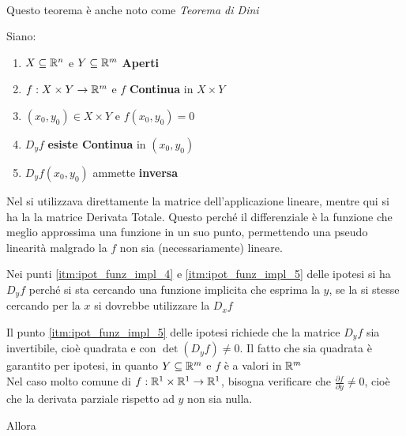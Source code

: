 \begin{theorem}~
	\label{teo:funz_impl}
	\vspace*{-\baselineskip}
	\begin{note}
		Questo teorema è anche noto come \textit{Teorema di Dini}
	\end{note}
	Siano:
	\begin{enumerate}[noitemsep]
		\item \label{itm:ipot_funz_impl_1} $X \subseteq \mathbb{R}^n$ e $Y \subseteq \mathbb{R}^m$ \textbf{Aperti}
		\item \label{itm:ipot_funz_impl_2} $f: X \times Y \to \mathbb{R}^m$ e $f$ \textbf{Continua} in $X \times Y$
		\item \label{itm:ipot_funz_impl_3} $(x_0, y_0) \in X \times Y$ e $f(x_0, y_0) = 0$
		\item \label{itm:ipot_funz_impl_4} $D_yf$ \textbf{esiste Continua} in $(x_0, y_0)$
		\item \label{itm:ipot_funz_impl_5} $D_yf(x_0, y_0)$ ammette \textbf{inversa}
	\end{enumerate}
	\begin{note}
		\hypertarget{note:teo_funz_impl_note_ipot1}{}
		Nel  si utilizzava direttamente la matrice dell'applicazione lineare, mentre qui si ha la la matrice Derivata Totale. Questo perché il differenziale è la funzione che meglio approssima una funzione in un suo punto, permettendo una pseudo linearità malgrado la $f$ non sia (necessariamente) lineare.
	\end{note}
	\begin{note}
		Nei punti \ref{itm:ipot_funz_impl_4} e \ref{itm:ipot_funz_impl_5} delle ipotesi si ha $D_yf$ perché si sta cercando una funzione implicita che esprima la $y$, se la si stesse cercando per la $x$ si dovrebbe utilizzare la $D_xf$
	\end{note}
	\begin{note}
		Il punto \ref{itm:ipot_funz_impl_5} delle ipotesi richiede che la matrice $D_yf$ sia invertibile, cioè quadrata e con $\det(D_yf) \neq 0$. Il fatto che sia quadrata è garantito per ipotesi, in quanto $Y \subseteq \mathbb{R}^m$ e $f$ è a valori in $\mathbb{R}^m$\\
		Nel caso molto comune di $f: \mathbb{R}^1 \times \mathbb{R}^1 \to \mathbb{R}^1$, bisogna verificare che $\frac{\partial f}{\partial y} \neq 0$, cioè che la derivata parziale rispetto ad $y$ non sia nulla.
	\end{note}
	Allora
	\begin{enumerate}

\end{enumerate}
\end{theorem}
